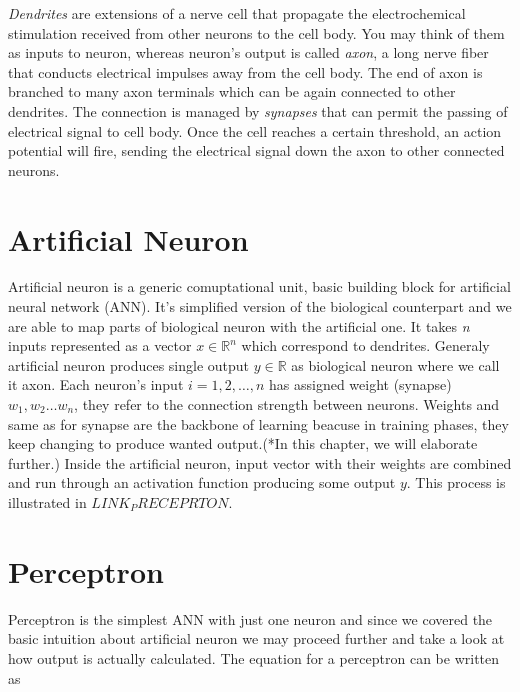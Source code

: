 
\textit{Dendrites} are extensions of a nerve cell that propagate the electrochemical stimulation received from other neurons to the cell body.
You may think of them as inputs to neuron, whereas neuron's output is called \textit{axon}, a long nerve fiber that conducts electrical impulses away from the cell body.
The end of axon is branched to many axon terminals which can be again connected to other dendrites.
The connection is managed by \textit{synapses} that can permit the passing of electrical signal to cell body.
Once the cell reaches a certain threshold, an action potential will fire, sending the electrical signal down the axon to other connected neurons.

\section{Artificial Neuron}

Artificial neuron is a generic comuptational unit, basic building block for artificial neural network (ANN).
It's simplified version of the biological counterpart and we are able to map parts of biological neuron with the artificial one.
It takes \textit{n} inputs represented as a vector $x\in\mathbb{R}^n$ which correspond to dendrites.
Generaly artificial neuron produces single output $y\in\mathbb{R}$ as biological neuron where we call it axon.
Each neuron's input $i=1,2,\ldots, n$ has assigned weight (synapse) $w_1, w_2 \ldots w_n$, they refer to the connection strength between neurons.
Weights and same as for synapse are the backbone of learning beacuse in training phases, they keep changing to produce wanted output.(*In this chapter, we will elaborate further.)
Inside the artificial neuron, input vector with their weights are combined and run through an activation function producing some output $y$.
This process is illustrated in $LINK_PRECEPRTON$.


\section{Perceptron}

Perceptron is the simplest ANN with just one neuron and since we covered the basic intuition about artificial neuron we may proceed further and take a look at how output is actually calculated.
The equation for a perceptron can be written as

